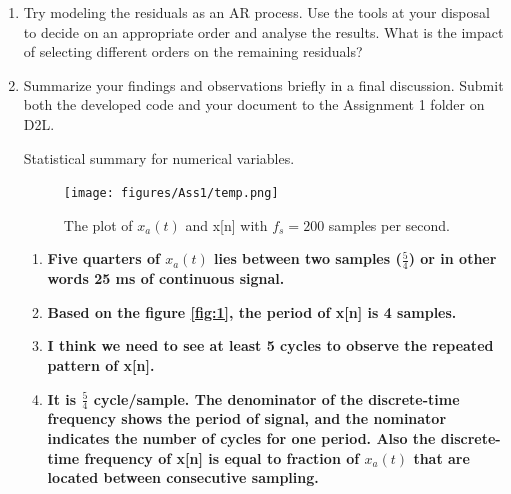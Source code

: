 \documentclass[12pt]{article}
\begin{document}
\begin{enumerate}
\item Try modeling the residuals as an AR process. Use the tools at your disposal to decide on an appropriate order and analyse the results. What is the impact of selecting different orders on the remaining residuals?
\item Summarize your findings and observations briefly in a final discussion. Submit both the developed code and your document to the Assignment 1 folder on D2L.

	\begin{table}[]
	 \centering
	\caption{Statistical summary for numerical variables.
	{\label{tab:stats_num_data}}}
	
	\end{table}




\begin{figure}[H]
    \centering
    \begin{minipage}[b]{0.8\textwidth}
        \texttt{[image: figures/Ass1/temp.png]}
    \end{minipage}
    \caption{The plot of $x_a(t)$ and x[n] with $f_s = 200$ samples per second.}
    \label{fig:2}
\end{figure}







\begin{enumerate}
\item \textbf{Five quarters of $x_a(t)$ lies between two samples ($\frac{5}{4}$) or in other words 25 ms of continuous signal.}

\item \textbf{Based on the figure \ref{fig:1}, the period of x[n] is 4 samples.}

\item \textbf{I think we need to see at least 5 cycles to observe the repeated pattern of x[n].}

\item \textbf{It is $\frac{5}{4}$ cycle/sample. The denominator of the discrete-time frequency shows the period of signal, and the nominator indicates the number of cycles for one period. Also the discrete-time frequency of x[n] is equal to fraction of $x_a(t)$ that are located between consecutive sampling.}
\end{enumerate}



\end{enumerate}
\end{document}
